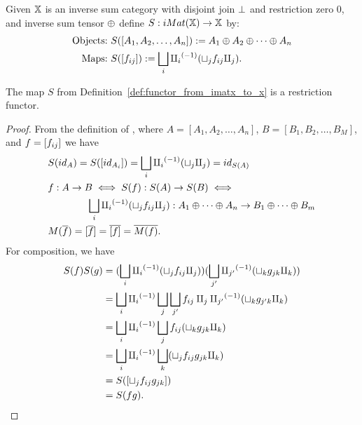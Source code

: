 \begin{definition}\label{def:functor_from_imatx_to_x}
  Given $\mathbb{X}$ is an inverse sum category with disjoint join $\perp$ and restriction zero $0$,
  and inverse sum tensor $\oplus$ define $S:iMat({\mathbb{X}}) \to \mathbb{X}$ by:
  \begin{align*}
    \text{Objects:}\ &S([A_1,A_2, \ldots, A_n]) := A_1\oplus A_2\oplus\cdots\oplus A_n\\
    \text{Maps:}\ &S([f_{ij}]) := \bigsqcup_i {\amalg_{i}}^{(-1)} (\sqcup_j f_{ij} \amalg_{j}).
  \end{align*}
\end{definition}

\begin{lemma}\label{lem:s_is_a_functor}
  The map $S$ from Definition~\ref{def:functor_from_imatx_to_x} is a restriction functor.
\end{lemma}
\begin{proof}
  From the definition of \imatx, where $A = [A_1,A_2,\ldots,A_n]$, $B=[B_1,B_2,\ldots,B_M]$,
  and $f = [f_{ij}]$ we have
  \begin{align*}
    &S(id_A)  = S([id_{A_i}]) = \bigsqcup_i {\amalg_{i}}^{(-1)} (\sqcup_j \amalg_{j}) = id_{S(A)}\\
    &f: A\to B  \iff S(f):S(A)\to S(B) \iff \\
    &\qquad \qquad  \bigsqcup_i {\amalg_{i}}^{(-1)} (\sqcup_j f_{ij} \amalg_{j}) : A_1\oplus\cdots\oplus A_n \to B_1\oplus\cdots\oplus B_m\\
    &M(\overline{f}) = [\overline{f}] = \overline{[f]} = \overline{M(f)}.
  \end{align*}
  For composition, we have
  \begin{align*}
    S(f)S(g) & = (\bigsqcup_i {\amalg_{i}}^{(-1)} (\sqcup_j f_{ij} \amalg_{j}))
                  (\bigsqcup_{j'} {\amalg_{j'}}^{(-1)} (\sqcup_k g_{jk} \amalg_{k})) \\
    &= \bigsqcup_i {\amalg_{i}}^{(-1)} \bigsqcup_j \bigsqcup_{j'} f_{ij} \amalg_{j} {\amalg_{j'}}^{(-1)}
            (\sqcup_k g_{j'k} \amalg_{k}) \\
    &= \bigsqcup_i {\amalg_{i}}^{(-1)} \bigsqcup_j  f_{ij} (\sqcup_k g_{jk} \amalg_{k}) \\
    &= \bigsqcup_i {\amalg_{i}}^{(-1)} \bigsqcup_k (\sqcup_j  f_{ij}  g_{jk} \amalg_{k}) \\
    &= S([\sqcup_j f_{ij} g_{jk}]) \\
    &= S(f g).
  \end{align*}

\end{proof}

